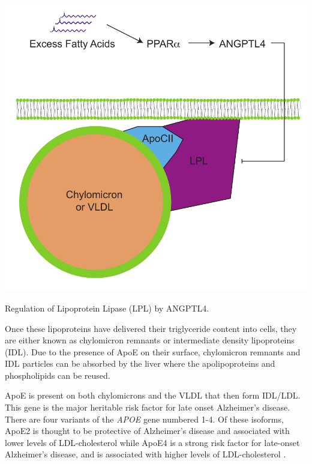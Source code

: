 \documentclass{tufte-handout}
\begin{document}
\begin{marginfigure}
\includegraphics{figures/Angptl4-PPARa.pdf}
\caption{Regulation of Lipoprotein Lipase (LPL) by ANGPTL4.}
\label{fig:angptl4}
\end{marginfigure}

  Once these lipoproteins have delivered their triglyceride content into cells, they are either known as chylomicron remnants or intermediate density lipoproteins (IDL).  Due to the presence of ApoE on their surface, chylomicron remnants and IDL particles can be absorbed by the liver where the apolipoproteins and phospholipids can be reused.

  ApoE is present on both chylomicrons and the VLDL that then form IDL/LDL.  This gene is the major heritable risk factor for late onset Alzheimer's disease.  There are four variants of the \textit{APOE} gene numbered 1-4.  Of these isoforms, ApoE2 is thought to be protective of Alzheimer's disease and associated with lower levels of LDL-cholesterol while ApoE4 is a strong risk factor for late-onset Alzheimer's disease, and is associated with higher levels of LDL-cholesterol \citep{Poirier1993,Corder1993}.  
\end{document}
